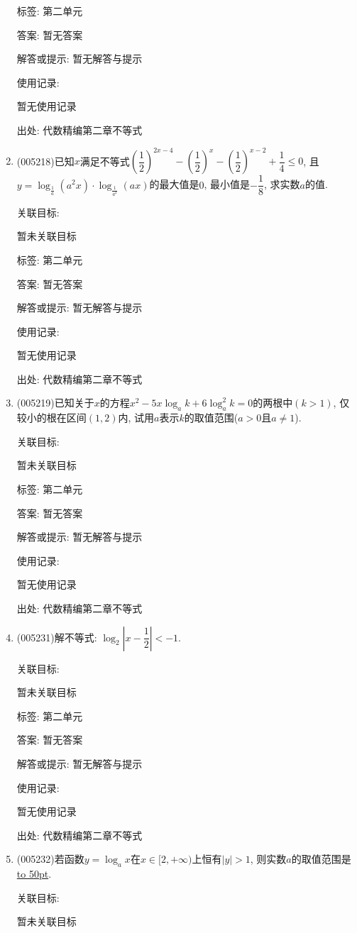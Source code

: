 \documentclass[10pt,a4paper]{article}
\newcommand{\blank}[1]{\underline{\hbox to #1pt{}}}
\begin{document}
\begin{enumerate}[1.]
标签: 第二单元

答案: 暂无答案

解答或提示: 暂无解答与提示

使用记录:

暂无使用记录


出处: 代数精编第二章不等式
\item { (005218)}已知$x$满足不等式$(\dfrac 12)^{2x-4}-(\dfrac 12)^x-(\dfrac 12)^{x-2}+\dfrac 14\le 0$, 且$y=\log_{\frac 1a}(a^2x)\cdot \log_{\frac 1{a^2}}(ax)$的最大值是$0$, 最小值是$-\dfrac 18$, 求实数$a$的值.


关联目标:

暂未关联目标



标签: 第二单元

答案: 暂无答案

解答或提示: 暂无解答与提示

使用记录:

暂无使用记录


出处: 代数精编第二章不等式
\item { (005219)}已知关于$x$的方程$x^2-5x\log_ak+6\log _a^2k=0$的两根中$(k>1)$, 仅较小的根在区间$(1,2)$内, 试用$a$表示$k$的取值范围($a>0$且$a\ne 1$).


关联目标:

暂未关联目标



标签: 第二单元

答案: 暂无答案

解答或提示: 暂无解答与提示

使用记录:

暂无使用记录


出处: 代数精编第二章不等式
\item { (005231)}解不等式: $\log_2|x-\dfrac 12|<-1$.


关联目标:

暂未关联目标



标签: 第二单元

答案: 暂无答案

解答或提示: 暂无解答与提示

使用记录:

暂无使用记录


出处: 代数精编第二章不等式
\item { (005232)}若函数$y=\log_ax$在$x\in [2,+\infty)$上恒有$|y|>1$, 则实数$a$的取值范围是\blank{50}.


关联目标:

暂未关联目标




\end{enumerate}
\end{document}
